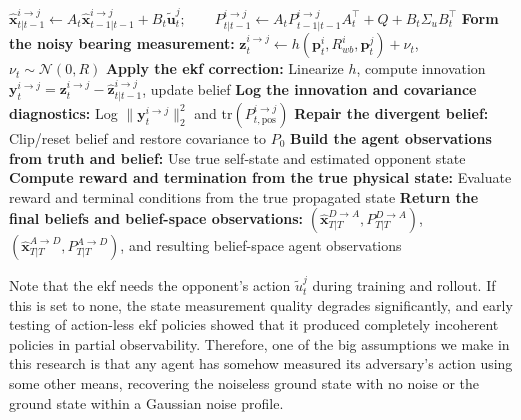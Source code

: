 \begin{algorithm}[H]
\begin{algorithmic}[1]
    \State \hspace{1em} $\hat{\mathbf{x}}_{t|t-1}^{i\to j}\leftarrow A_t\hat{\mathbf{x}}_{t-1|t-1}^{i\to j}+B_t\tilde{\mathbf{u}}_t^j;\qquad
P_{t|t-1}^{i\to j}\leftarrow A_t P_{t-1|t-1}^{i\to j} A_t^\top + Q + B_t\Sigma_u B_t^\top$
      \State \textbf{Form the noisy bearing measurement:}
      \State \hspace{1em} $\mathbf{z}^{i \to j}_t\leftarrow h(\mathbf{p}_t^i, R_{wb}^i, \mathbf{p}_t^j) + \nu_t$, $\nu_t\sim\mathcal{N}(0,R)$
      \State \textbf{Apply the \acs{ekf} correction:}
      \State \hspace{1em} Linearize $h$, compute innovation $\mathbf{y}^{i \to j}_t = \mathbf{z}^{i \to j}_t - \hat{\mathbf{z}}^{i \to j}_{t|t-1}$, update belief
      \State \textbf{Log the innovation and covariance diagnostics:}
      \State \hspace{1em} Log $\|\mathbf{y}_t^{i\to j}\|_2^2$ and $\mathrm{tr}(P^{i\to j}_{t,\mathrm{pos}})$
    \EndIf
      \State \textbf{Repair the divergent belief:}
      \State \hspace{1em} Clip/reset belief and restore covariance to $P_0$
    \EndIf
  \EndFor
  \State \textbf{Build the agent observations from truth and belief:}
  \State \hspace{1em} Use true self-state and estimated opponent state
  \State \textbf{Compute reward and termination from the true physical state:}
  \State \hspace{1em} Evaluate reward and terminal conditions from the true propagated state
\EndFor
\State \textbf{Return the final beliefs and belief-space observations:}
\State \hspace{1em} $(\hat{\mathbf{x}}^{D\to A}_{T|T},P^{D\to A}_{T|T})$, $(\hat{\mathbf{x}}^{A\to D}_{T|T},P^{A\to D}_{T|T})$, and resulting belief-space agent observations
\end{algorithmic}
\end{algorithm}

Note that the \acs{ekf} needs the opponent's action $\tilde{u}_t^j$ during training and rollout. If this is set to none, the state measurement quality degrades significantly, and early testing of action-less \acs{ekf} policies showed that it produced completely incoherent policies in partial observability. Therefore, one of the big assumptions we make in this research is that any agent has somehow measured its adversary's action using some other means, recovering the noiseless ground state with no noise or the ground state within a Gaussian noise profile.

